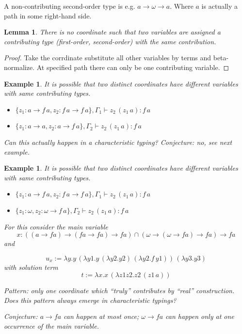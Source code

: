 \documentclass[10pt,a4paper]{article}
\theoremstyle{plain}%
\newtheorem{lemma}[theorem]{Lemma}
\newtheorem{example}[theorem]{Example}
\begin{document}
A non-contributing second-order type is e.g. $a \to \omega \to a$.
Where $a$ is actually a path in some right-hand side.

\begin{lemma}
There is no coordinate such that two variables are assigned a contributing type (first-order, second-order) with the same contribution.
\end{lemma}

\begin{proof}
Take the corrdinate substitute all other variables by terms and beta-normalize.
At specified path there can only be one contributing variable.
\end{proof}

\begin{example}
It is possible that two distinct coordinates have different variables with same contributing types.
\begin{itemize}
\item $\{z_1 : a \to f\,a, z_2 : f\,a \to f\,a\}, \Gamma_1 \vdash z_2\,(z_1\,a) : f\,a$
\item $\{z_1 : a \to a , z_2 : a \to f\,a\}, \Gamma_2 \vdash z_2\,(z_1\,a) : f\,a$
\end{itemize}
{\color{red}Can this actually happen in a characteristic typing?}
Conjecture: no, see next example.
\end{example}

\begin{example}
It is possible that two distinct coordinates have different variables with same contributing types.
\begin{itemize}
\item $\{z_1 : a \to f\,a, z_2 : f\,a \to f\,a\}, \Gamma_1 \vdash z_2\,(z_1\,a) : f\,a$
\item $\{z_1 : \omega , z_2 : \omega \to f\,a\}, \Gamma_2 \vdash z_2\,(z_1\,a) : f\,a$
\end{itemize}


For this consider the main variable
\[x : ((a \to fa) \to (fa \to fa) \to fa) \cap (\omega \to (\omega \to fa) \to fa) \to fa\]
and

\[u_x := \lambda y. y\,(\lambda y1. y\,(\lambda y2.y2)\,(\lambda y2.f\,y1))\,(\lambda y3.y3)\]
with solution term
\[t := \lambda x.x\,(\lambda z1 z2.z2\,(z1\,a))\]

Pattern: only one coordinate which \enquote{truly} contributes by \enquote{real} construction.
{\color{red}Does this pattern always emerge in characteristic typings?}

Conjecture: $a \to fa$ can happen at most once; $\omega \to fa$ can happen only at one occurrence of the main variable.
\end{example}
\end{document}
